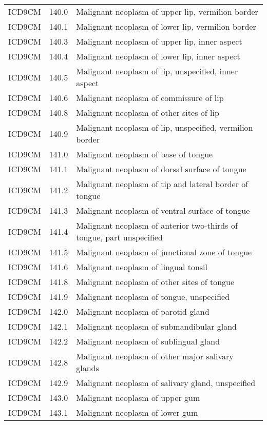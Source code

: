 \begin{longtable}{p{}p{}p{}}
  ICD9CM & 140.0 & Malignant neoplasm of upper lip, vermilion border \\ 
  ICD9CM & 140.1 & Malignant neoplasm of lower lip, vermilion border \\ 
  ICD9CM & 140.3 & Malignant neoplasm of upper lip, inner aspect \\ 
  ICD9CM & 140.4 & Malignant neoplasm of lower lip, inner aspect \\ 
  ICD9CM & 140.5 & Malignant neoplasm of lip, unspecified, inner aspect \\ 
  ICD9CM & 140.6 & Malignant neoplasm of commissure of lip \\ 
  ICD9CM & 140.8 & Malignant neoplasm of other sites of lip \\ 
  ICD9CM & 140.9 & Malignant neoplasm of lip, unspecified, vermilion border \\ 
  ICD9CM & 141.0 & Malignant neoplasm of base of tongue \\ 
  ICD9CM & 141.1 & Malignant neoplasm of dorsal surface of tongue \\ 
  ICD9CM & 141.2 & Malignant neoplasm of tip and lateral border of tongue \\ 
  ICD9CM & 141.3 & Malignant neoplasm of ventral surface of tongue \\ 
  ICD9CM & 141.4 & Malignant neoplasm of anterior two-thirds of tongue, part unspecified \\ 
  ICD9CM & 141.5 & Malignant neoplasm of junctional zone of tongue \\ 
  ICD9CM & 141.6 & Malignant neoplasm of lingual tonsil \\ 
  ICD9CM & 141.8 & Malignant neoplasm of other sites of tongue \\ 
  ICD9CM & 141.9 & Malignant neoplasm of tongue, unspecified \\ 
  ICD9CM & 142.0 & Malignant neoplasm of parotid gland \\ 
  ICD9CM & 142.1 & Malignant neoplasm of submandibular gland \\ 
  ICD9CM & 142.2 & Malignant neoplasm of sublingual gland \\ 
  ICD9CM & 142.8 & Malignant neoplasm of other major salivary glands \\ 
  ICD9CM & 142.9 & Malignant neoplasm of salivary gland, unspecified \\ 
  ICD9CM & 143.0 & Malignant neoplasm of upper gum \\ 
  ICD9CM & 143.1 & Malignant neoplasm of lower gum \\ 

\end{longtable}
